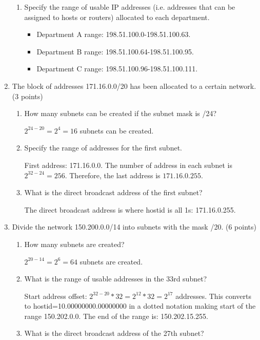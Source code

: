 \documentclass{article}
\begin{document}
\begin{enumerate}
\begin{enumerate}
    \item Specify the range of usable IP addresses (i.e. addresses that can be assigned to hosts or routers) allocated to each department.
    \begin{itemize}
      \item Department A range: 198.51.100.0-198.51.100.63.
      \item Department B range: 198.51.100.64-198.51.100.95.
      \item Department C range: 198.51.100.96-198.51.100.111.
    \end{itemize}
  \end{enumerate}

  \item The block of addresses 171.16.0.0/20 has been allocated to a certain network. (3 points)
  \begin{enumerate}
    \item How many subnets can be created if the subnet mask is /24?

    $2^{24-20}=2^4=16$ subnets can be created.

    \item Specify the range of addresses for the first subnet.

    First address: 171.16.0.0. The number of address in each subnet is $2^{32-24}=256$. Therefore, the last address is $171.16.0.255$.

    \item What is the direct broadcast address of the first subnet?

    The direct broadcast address is where hostid is all 1s: 171.16.0.255.
  \end{enumerate}

  \item Divide the network 150.200.0.0/14 into subnets with the mask /20. (6 points)
  \begin{enumerate}
    \item How many subnets are created?
    
    $2^{20-14}=2^6=64$ subnets are created.

    \item What is the range of usable addresses in the 33rd subnet?
    
    Start address offset: $2^{32-20}*32=2^{12}*32=2^{17}$ addresses. This converts to hostid=10.00000000.00000000 in a dotted notation making start of the range 150.202.0.0.
    The end of the range is: 150.202.15.255.

    \item What is the direct broadcast address of the 27th subnet?


\end{enumerate}
\end{enumerate}
\end{document}
